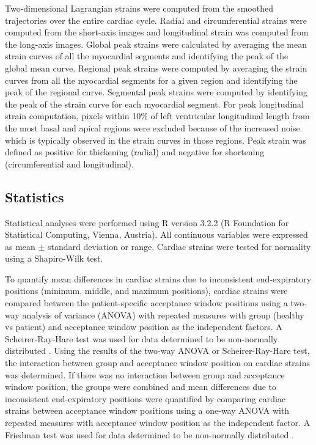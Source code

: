 	Two-dimensional Lagrangian strains were computed from the smoothed trajectories over the entire cardiac cycle. Radial and circumferential strains were computed from the short-axis images and longitudinal strain was computed from the long-axis images. Global peak strains were calculated by averaging the mean strain curves of all the myocardial segments and identifying the peak of the global mean curve. Regional peak strains were computed by averaging the strain curves from all the myocardial segments for a given region and identifying the peak of the regional curve. Segmental peak strains were computed by identifying the peak of the strain curve for each myocardial segment. For peak longitudinal strain computation, pixels within 10\% of left ventricular longitudinal length from the most basal and apical regions were excluded because of the increased noise which is typically observed in the strain curves in those regions. Peak strain was defined as positive for thickening (radial) and negative for shortening (circumferential and longitudinal).
	
\subsection{Statistics}
	Statistical analyses were performed using R version 3.2.2 (R Foundation for Statistical Computing, Vienna, Austria). All continuous variables were expressed as mean $\pm$ standard deviation or range. Cardiac strains were tested for normality using a Shapiro-Wilk test.
	
	To quantify mean differences in cardiac strains due to inconsistent end-expiratory positions (minimum, middle, and maximum positions), cardiac strains were compared between the patient-specific acceptance window positions using a two-way analysis of variance (ANOVA) with repeated measures with group (healthy vs patient) and acceptance window position as the independent factors. A Scheirer-Ray-Hare test was used for data determined to be non-normally distributed \cite{Dytham2011}. Using the results of the two-way ANOVA or Scheirer-Ray-Hare test, the interaction between group and acceptance window position on cardiac strains was determined. If there was no interaction between group and acceptance window position, the groups were combined and mean differences due to inconsistent end-expiratory positions were quantified by comparing cardiac strains between acceptance window positions using a one-way ANOVA with repeated measures with acceptance window position as the independent factor. A Friedman test was used for data determined to be non-normally distributed \cite{Dytham2011}.
	
